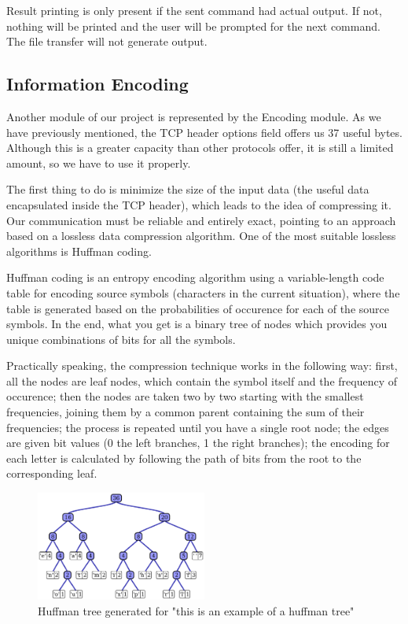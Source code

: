 Result printing is only present if the sent command had actual output. If not, nothing will
be printed and the user will be prompted for the next command. The file transfer will not 
generate output.



\subsection{Information Encoding}

Another module of our project is represented by the Encoding module. As we
have previously mentioned, the TCP header options field offers us 37 useful
bytes. Although this is a greater capacity than other protocols offer, it is
still a limited amount, so we have to use it properly.

The first thing to do is minimize the size of the input data (the useful
data encapsulated inside the TCP header), which leads to the idea of compressing
it. Our communication must be reliable and entirely exact, pointing to an
approach based on a lossless data compression algorithm. One of the most
suitable lossless algorithms is Huffman coding.

Huffman coding\cite{huffman1952method} is an entropy encoding algorithm using
a variable-length code table for encoding source symbols (characters in the
current situation), where the table is generated based on the probabilities of
occurence for each of the source symbols. In the end, what you get is a binary
tree of nodes which provides you unique combinations of bits for all the
symbols.

Practically speaking, the compression technique works in the following way:
first, all the nodes are leaf nodes, which contain the symbol itself and the
frequency of occurence; then the nodes are taken two by two starting with the
smallest frequencies, joining them by a common parent containing the sum of
their frequencies; the process is repeated until you have a single root node;
the edges are given bit values (0 the left branches, 1 the right branches);
the encoding for each letter is calculated by following the path of bits from
the root to the corresponding leaf.

\begin{figure}
  \centering
  \includegraphics[width=0.5\textwidth]{img/huffman}
  \caption{Huffman tree generated for "this is an example of a huffman tree"}
  \label{fig:huffman}
\end{figure}

